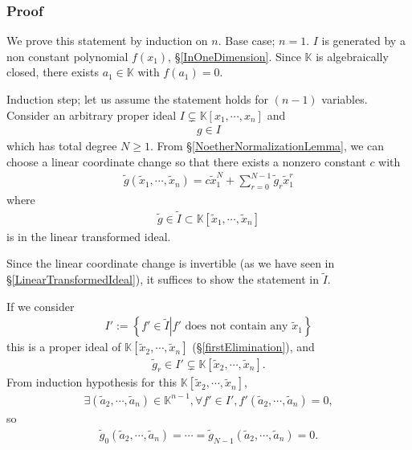 \documentclass[11pt]{book}
\begin{document}
\subsubsection{Proof}
We prove this statement by induction on $n$.
Base case; $n=1$.
$I$ is generated by a non constant polynomial $f(x_1)$, \S\ref{InOneDimension}.
Since $\mathbb{K}$ is algebraically closed, there exists $a_1 \in \mathbb{K}$ with $f(a_1) = 0$.

Induction step; let us assume the statement holds for $(n-1)$ variables.
Consider an arbitrary proper ideal $I \subsetneq \mathbb{K}[x_1, \cdots, x_n]$ and
\begin{eqnarray}
g \in I
\end{eqnarray}
which has total degree $N \geq 1$.
From \S\ref{NoetherNormalizationLemma}, we can choose a linear coordinate change so that there exists a nonzero constant $c$ with
\begin{eqnarray}
\tilde{g}(\tilde{x}_1, \cdots, \tilde{x}_n) = c \tilde{x}_1^N + \sum_{r=0}^{N-1} \tilde{g}_r \tilde{x}_1^r
\end{eqnarray}
where
\begin{eqnarray}
\tilde{g} \in \tilde{I} \subset \mathbb{K}[\tilde{x}_1,\cdots, \tilde{x}_n]
\end{eqnarray}
is in the linear transformed ideal.

Since the linear coordinate change is invertible (as we have seen in \S\ref{LinearTransformedIdeal}), it suffices to show the statement in $\tilde{I}$.

If we consider
\begin{eqnarray}
I' := \left\{ \left. f' \in \tilde{I} \right| \text{$f'$ does not contain any $\tilde{x}_1$} \right\}
\end{eqnarray}
this is a proper ideal of $\mathbb{K}[\tilde{x}_2,\cdots, \tilde{x}_n]$ (\S\ref{firstElimination}), and
\begin{eqnarray}
\tilde{g}_r \in I' \subsetneq \mathbb{K}[\tilde{x}_2,\cdots, \tilde{x}_n].
\end{eqnarray}
From induction hypothesis for this $\mathbb{K}[\tilde{x}_2,\cdots, \tilde{x}_n]$,
\begin{eqnarray}
\exists (\tilde{a}_2, \cdots, \tilde{a}_n) \in \mathbb{K}^{n-1}, \forall f' \in I', f'(\tilde{a}_2, \cdots, \tilde{a}_n) = 0,
\end{eqnarray}
so
\begin{eqnarray}
\tilde{g}_0(\tilde{a}_2, \cdots, \tilde{a}_n) = \cdots = \tilde{g}_{N-1}(\tilde{a}_2, \cdots, \tilde{a}_n) = 0.
\end{eqnarray}
\end{document}
